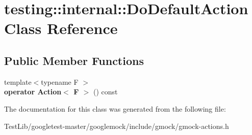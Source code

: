 \hypertarget{classtesting_1_1internal_1_1DoDefaultAction}{}\section{testing\+:\+:internal\+:\+:Do\+Default\+Action Class Reference}
\label{classtesting_1_1internal_1_1DoDefaultAction}
\subsection*{Public Member Functions}
\begin{DoxyCompactItemize}
\item 
\mbox{\label{classtesting_1_1internal_1_1DoDefaultAction_aea08828a0d64847e29ab7a5abeb74149}} 
{\footnotesize template$<$typename F $>$ }\\{\bfseries operator Action$<$ F $>$} () const
\end{DoxyCompactItemize}


The documentation for this class was generated from the following file\+:\begin{DoxyCompactItemize}
\item 
Test\+Lib/googletest-\/master/googlemock/include/gmock/gmock-\/actions.\+h\end{DoxyCompactItemize}
